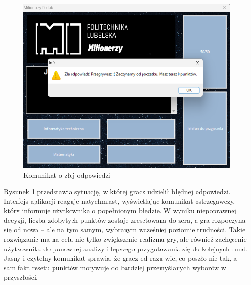 \documentclass[]{article}
\begin{document}
	\begin{figure}[H]
		\centering
		\includegraphics[scale=0.3]{6.png}
		\caption{Komunikat o złej odpowiedzi}
		\label{rys:6}
	\end{figure}
Rysunek \ref{rys:6} przedstawia sytuację, w której gracz udzielił błędnej odpowiedzi. Interfejs aplikacji reaguje natychmiast, wyświetlając komunikat ostrzegawczy, który informuje użytkownika o popełnionym błędzie. W wyniku niepoprawnej decyzji, liczba zdobytych punktów zostaje zresetowana do zera, a gra rozpoczyna się od nowa – ale na tym samym, wybranym wcześniej poziomie trudności. Takie rozwiązanie ma na celu nie tylko zwiększenie realizmu gry, ale również zachęcenie użytkownika do ponownej analizy i lepszego przygotowania się do kolejnych rund. Jasny i czytelny komunikat sprawia, że gracz od razu wie, co poszło nie tak, a sam fakt resetu punktów motywuje do bardziej przemyślanych wyborów w przyszłości.
	
\end{document}
